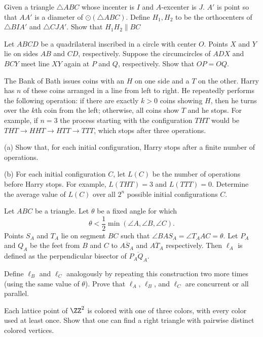 \documentclass[11pt]{scrartcl}
\begin{document}
\begin{problem}[528504335909385]
Given a triangle $ \triangle{ABC} $ whose incenter is $ I $ and $ A $-excenter is $ J $. $ A' $ is point so that $ AA' $ is a diameter of $ \odot\left(\triangle{ABC}\right) $. Define $ H_{1}, H_{2} $ to be the orthocenters of $ \triangle{BIA'} $ and $ \triangle{CJA'} $. Show that $ H_{1}H_{2} \parallel BC $
\end{problem}
\begin{problem}[4603228855421380865]
	Let $ABCD$ be a quadrilateral inscribed in a circle with center $O$. Points $X$ and $Y$ lie on sides $AB$ and $CD$, respectively. Suppose the circumcircles of $ADX$ and $BCY$ meet line $XY$ again at $P$ and $Q$, respectively. Show that $OP=OQ$.
\end{problem}
\begin{problem}[623590906176957]
	The Bank of Bath issues coins with an $H$ on one side and a $T$ on the other. Harry has $n$ of these coins arranged in a line from left to right. He repeatedly performs the following operation: if there are exactly $k>0$ coins showing $H$, then he turns over the $k$th coin from the left; otherwise, all coins show $T$ and he stops. For example, if $n=3$ the process starting with the configuration $THT$ would be $THT \to HHT  \to HTT \to TTT$, which stops after three operations.

(a) Show that, for each initial configuration, Harry stops after a finite number of operations.

(b) For each initial configuration $C$, let $L(C)$ be the number of operations before Harry stops. For example, $L(THT) = 3$ and $L(TTT) = 0$. Determine the average value of $L(C)$ over all $2^n$ possible initial configurations $C$.
\end{problem}
\begin{problem}[23047452603115]
Let $ABC$ be a triangle. Let $\theta$ be a fixed angle for which\[\theta<\frac12\min(\angle A,\angle B,\angle C).\]Points $S_A$ and $T_A$ lie on segment $BC$ such that $\angle BAS_A=\angle T_AAC=\theta$. Let $P_A$ and $Q_A$ be the feet from $B$ and $C$ to $\overline{AS_A}$ and $\overline{AT_A}$ respectively. Then $\ell_A$ is defined as the perpendicular bisector of $\overline{P_AQ_A}$.

Define $\ell_B$ and $\ell_C$ analogously by repeating this construction two more times (using the same value of $\theta$). Prove that $\ell_A$, $\ell_B$, and $\ell_C$ are concurrent or all parallel.
\end{problem}
\begin{problem}[9187468721920084868]
  Each lattice point of $\ZZ^2$ is colored with one of three colors,
  with every color used at least once.
  Show that one can find a right triangle with pairwise distinct colored vertices.
\end{problem}
\end{document}
